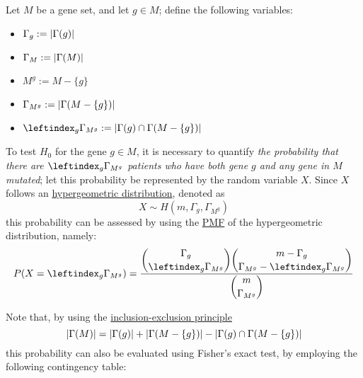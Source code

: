 \begin{definition}[Notation]
    Let $M$ be a gene set, and let $g \in M$; define the following variables:

    \begin{itemize}
        \item $\Gamma_g := \left|\Gamma(g)\right|$
        \item $\Gamma_M := \left|\Gamma(M)\right|$
        \item $M^g := M - \{g\}$
        \item $\Gamma_{M^g} := \left|\Gamma(M - \{g\})\right|$
        \item $\inters := \abs{\Gamma(g) \cap \Gamma(M - \{g\})}$
    \end{itemize}
\end{definition}

To test $H_0$ for the gene $g \in M$, it is necessary to quantify \textit{the probability that there are $\inters$ patients who have both gene $g$ and any gene in $M$ mutated}; let this probability be represented by the random variable $X$. Since $X$ follows an \href{https://en.wikipedia.org/wiki/Hypergeometric_distribution}{hypergeometric distribution}, denoted as $$X \sim H(m, \Gamma_g, \Gamma_{M^g})$$ this probability can be assessed by using the \href{https://en.wikipedia.org/wiki/Probability_mass_function}{PMF} of the hypergeometric distribution, namely: $$P(X = \inters) = \dfrac{\dbinom{\Gamma_g}{\inters}\dbinom{m - \Gamma_g}{\Gamma_{M^g} - \inters}}{\dbinom{m}{\Gamma_{M^g}}}$$

Note that, by using the \href{https://en.wikipedia.org/wiki/Inclusion%E2%80%93exclusion_principle}{inclusion-exclusion principle} $$\left|\Gamma(M)\right| = \left|\Gamma(g)\right| + \left|\Gamma(M - \{g\})\right| - \left|\Gamma(g) \cap \Gamma(M - \{g\})\right|$$ this probability can also be evaluated using Fisher's exact test, by employing the following contingency table:

\begin{table}[H]
    \centering
    \caption{Fisher's exact test}
\end{table}

